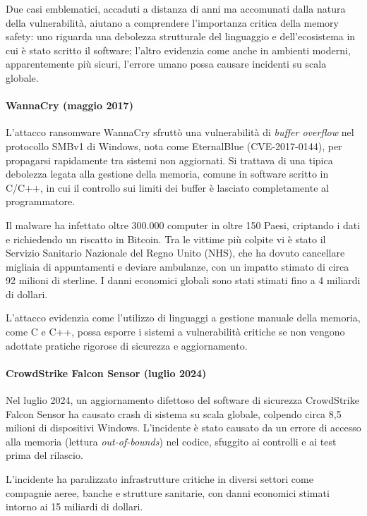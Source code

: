 \bigskip
\noindent
Due casi emblematici, accaduti a distanza di anni ma accomunati dalla natura della
vulnerabilità, aiutano a comprendere l'importanza critica della memory safety: uno
riguarda una debolezza strutturale del linguaggio e dell'ecosistema in cui è stato
scritto il software; l'altro evidenzia come anche in ambienti moderni, apparentemente
più sicuri, l'errore umano possa causare incidenti su scala globale.

\paragraph{WannaCry (maggio 2017)}

L'attacco ransomware WannaCry sfruttò una vulnerabilità di \textit{buffer
overflow} nel protocollo SMBv1 di Windows, nota come EternalBlue (CVE-2017-0144),
per propagarsi rapidamente tra sistemi non aggiornati. Si trattava di una tipica
debolezza legata alla gestione della memoria, comune in software scritto in C/C++,
in cui il controllo sui limiti dei buffer è lasciato completamente al
programmatore.

Il malware ha infettato oltre 300.000 computer in oltre 150 Paesi, criptando i dati
e richiedendo un riscatto in Bitcoin. Tra le vittime più colpite vi è stato il
Servizio Sanitario Nazionale del Regno Unito (NHS), che ha dovuto cancellare migliaia
di appuntamenti e deviare ambulanze, con un impatto stimato di circa 92 milioni
di sterline. I danni economici globali sono stati stimati fino a 4 miliardi di dollari.~\cite{wannacry_kaspersky}

L'attacco evidenzia come l'utilizzo di linguaggi a gestione manuale della memoria,
come C e C++, possa esporre i sistemi a vulnerabilità critiche se non vengono adottate
pratiche rigorose di sicurezza e aggiornamento.

\paragraph{CrowdStrike Falcon Sensor (luglio 2024)}

Nel luglio 2024, un aggiornamento difettoso del software di sicurezza
CrowdStrike Falcon Sensor ha causato crash di sistema su scala globale, colpendo
circa 8,5 milioni di dispositivi Windows. L'incidente è stato causato da un
errore di accesso alla memoria (lettura \textit{out-of-bounds}) nel codice,
sfuggito ai controlli e ai test prima del rilascio.

L'incidente ha paralizzato infrastrutture critiche in diversi settori come
compagnie aeree, banche e strutture sanitarie, con danni economici stimati
intorno ai 15 miliardi di dollari.~\cite{crowdstrike_bug_wired}~\cite{crowdstrike_bug_wired_cost}

